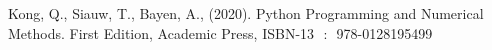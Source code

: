 \begin{refenumerate}
\item Kong, Q., Siauw, T., Bayen, A., (2020). Python Programming and Numerical Methods. First Edition, Academic Press,  ISBN-13 ‏ : ‎ 978-0128195499 \\
\end{refenumerate}





%



















%








